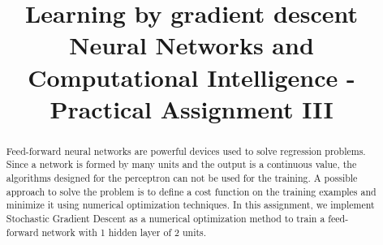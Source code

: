 \documentclass[conference]{IEEEtran}
\begin{document}
    \title{
        Learning by gradient descent\\
        \large Neural Networks and Computational Intelligence - Practical Assignment III
    }

    \author{
        \and
    }

    \maketitle

    \begin{abstract}
        Feed-forward neural networks are powerful devices used to solve regression problems.
        Since a network is formed by many units and the output is a continuous value, the algorithms designed for the perceptron can not be used for the training.
        A possible approach to solve the problem is to define a cost function on the training examples and minimize it using numerical optimization techniques.
        In this assignment, we implement Stochastic Gradient Descent as a numerical optimization method to train a feed-forward network with 1 hidden layer of 2 units.
    \end{abstract}

    \acresetall

    
    
    
    
    
    

    
    

    \onecolumn
    
\end{document}
